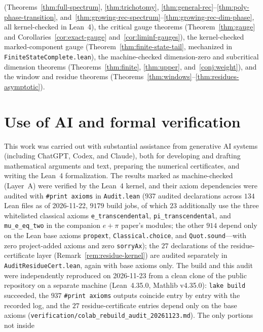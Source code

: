 \documentclass[11pt]{article}
\theoremstyle{definition}
\theoremstyle{remark}
\begin{document}
\begin{itemize}[leftmargin=1.5em]
(Theorems~\ref{thm:full-spectrum}, \ref{thm:trichotomy},
\ref{thm:general-rec}--\ref{thm:poly-phase-transition},
and~\ref{thm:growing-rec-spectrum}--\ref{thm:growing-rec-dim-phase}, all kernel-checked
in Lean~4), the critical gauge theorems
(Theorem~\ref{thm:gauge} and Corollaries~\ref{cor:exact-gauge}
and~\ref{cor:liminf-gauges}), the kernel-checked marked-component gauge
(Theorem~\ref{thm:finite-state-tail}, mechanized in
\texttt{Finite\allowbreak State\allowbreak Complete.lean}), the machine-checked
dimension-zero and subcritical dimension theorems
(Theorems~\ref{thm:finite}, \ref{thm:upper}, and~\ref{conj:weight}), and the
window and residue theorems (Theorems~\ref{thm:windows}--\ref{thm:residues-asymptotic}).
\end{itemize}

\section*{Use of AI and formal verification}
This work was carried out with substantial assistance from generative AI
systems (including ChatGPT, Codex, and Claude), both for developing and drafting
mathematical arguments and text, preparing the numerical certificates, and
writing the Lean~4 formalization. The results marked as machine-checked (Layer~A)
were verified by the Lean~4 kernel, and their axiom dependencies were audited
with \texttt{\#print axioms} in \texttt{Audit.lean} ($937$ audited declarations
across $134$ Lean files as of 2026-11-22, $9179$ build jobs, of which $23$ additionally use the three whitelisted classical
axioms \texttt{e\_transcendental}, \texttt{pi\_transcendental}, and
\texttt{mu\_e\_eq\_two} in the companion $e+\pi$ paper's modules; the other $914$
depend only on the Lean base axioms \texttt{propext}, \texttt{Classical.choice},
and \texttt{Quot.sound}---with zero
project-added axioms and zero \texttt{sorryAx}); the $27$ declarations of the
residue-certificate layer (Remark~\ref{rem:residue-kernel}) are audited separately in
\texttt{AuditResidueCert.lean}, again with base axioms only. The build and this audit were independently reproduced on 2026-11-23 from a
clean clone of the public repository on a separate machine (Lean~4.35.0,
Mathlib v4.35.0): \texttt{lake build} succeeded, the $937$
\texttt{\#print axioms} outputs coincide entry by entry with the recorded log, and the $27$ residue-certificate entries depend only on the base axioms
(\texttt{verification/\allowbreak colab\_\allowbreak rebuild\_\allowbreak audit\_\allowbreak 20261123.md}). The only portions not inside
\end{document}
